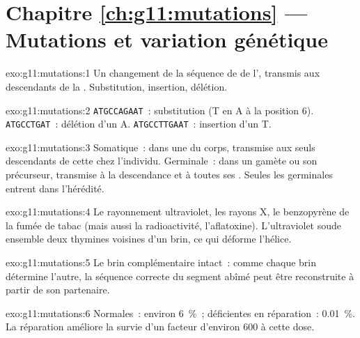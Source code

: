 \section*{Chapitre \ref{ch:g11:mutations} --- Mutations et variation génétique}

\begin{solution}{exo:g11:mutations:1}
Un changement de la séquence de  de l', transmis aux
descendants de la . Substitution, insertion, délétion.
\end{solution}

\begin{solution}{exo:g11:mutations:2}
\texttt{ATGCCAGAAT}~: substitution (T en A à la position 6).
\texttt{ATGCCTGAT}~: délétion d'un A. \texttt{ATGCCTTGAAT}~: insertion
d'un T.
\end{solution}

\begin{solution}{exo:g11:mutations:3}
Somatique~: dans une  du corps, transmise aux seuls descendants
de cette  chez l'individu. Germinale~: dans un gamète ou son
précurseur, transmise à la descendance et à toutes ses . Seules
les  germinales entrent dans l'hérédité.
\end{solution}

\begin{solution}{exo:g11:mutations:4}
Le rayonnement ultraviolet, les rayons X, le benzopyrène de la fumée de
tabac (mais aussi la radioactivité, l'aflatoxine). L'ultraviolet soude
ensemble deux thymines voisines d'un brin, ce qui déforme l'hélice.
\end{solution}

\begin{solution}{exo:g11:mutations:5}
Le brin complémentaire intact~: comme chaque brin détermine l'autre, la
séquence correcte du segment abîmé peut être reconstruite à partir de
son partenaire.
\end{solution}

\begin{solution}{exo:g11:mutations:6}
Normales~: environ 6~\%~; déficientes en réparation~: 0.01~\%. La
réparation améliore la survie d'un facteur d'environ 600 à cette dose.
\end{solution}

